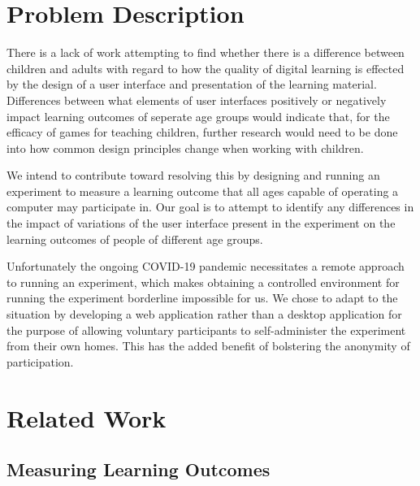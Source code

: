 \documentclass[12pt]{report}
\begin{document}
% 

\chapter{Problem Description}

There is a lack of work attempting to find whether there is a difference between children and adults with regard to how the quality of digital learning is effected by the design of a user interface and presentation of the learning material. Differences between what elements of user interfaces positively or negatively impact learning outcomes of seperate age groups would indicate that, for the efficacy of games for teaching children, further research would need to be done into how common design principles change when working with children.

We intend to contribute toward resolving this by designing and running an experiment to measure a learning outcome that all ages capable of operating a computer may participate in. Our goal is to attempt to identify any differences in the impact of variations of the user interface present in the experiment on the learning outcomes of people of different age groups.

Unfortunately the ongoing COVID-19 pandemic necessitates a remote approach to running an experiment, which makes obtaining a controlled environment for running the experiment borderline impossible for us. We chose to adapt to the situation by developing a web application rather than a desktop application for the purpose of allowing voluntary participants to self-administer the experiment from their own homes. This has the added benefit of bolstering the anonymity of participation.

\chapter{Related Work}

\section{Measuring Learning Outcomes}
\end{document}
